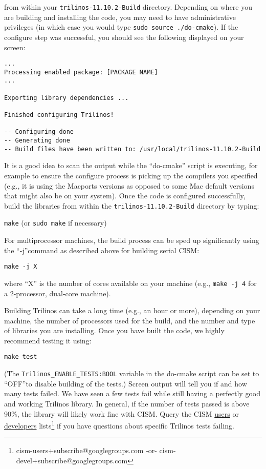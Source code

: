 \noindent
from within your \texttt{trilinos-11.10.2-Build} directory. Depending on where you are building and installing the code, you may need to have administrative privileges (in which case you would type \texttt{sudo source ./do-cmake}). If the configure step was successful, you should see the following displayed on your screen:

\begin{verbatim}
...
Processing enabled package: [PACKAGE NAME]
...

Exporting library dependencies ...

Finished configuring Trilinos!

-- Configuring done
-- Generating done
-- Build files have been written to: /usr/local/trilinos-11.10.2-Build
\end{verbatim}

It is a good idea to scan the output while the ``do-cmake'' script is executing, 
for example to ensure the configure process is picking up the compilers you specified 
(e.g., it is using the Macports versions as opposed to some Mac default versions that 
might also be on your system). Once the code is configured successfully, build the libraries 
from within the \texttt{trilinos-11.10.2-Build} directory by typing:

\texttt{make} (or \texttt{sudo make} if necessary) 

\noindent
For multiprocessor machines, the build process can be sped up significantly using 
the ``-j''command as described above for building serial CISM:

\texttt{make -j X}

\noindent
where ``X'' is the number of cores available on your machine (e.g., \texttt{make -j 4} 
for a 2-processor, dual-core machine).

Building Trilinos can take a long time (e.g., an hour or more), depending on your machine, 
the number of processors used for the build, and the number and type of libraries 
you are installing. Once you have built the code, we highly recommend testing it 
using:

 \texttt{make test} 

\noindent
(The \texttt{Trilinos\_ENABLE\_TESTS:BOOL}
variable in the do-cmake script can be set to ``OFF''to disable building of the tests.)
Screen output will tell you if and how many tests failed. We have seen 
a few tests fail while still having a perfectly good and working Trilinos library. 
In general, if the number of tests passed is above 90\%, the library will likely work fine with CISM.
Query the CISM \href{mailto:cism-users+subscribe@googlegroups.com}{users} or
\href{mailto:cism-devel+subscribe@googlegroups.com}{developers} lists\footnote{cism-users+subscribe@googlegroups.com -or- cism-devel+subscribe@googlegroups.com} 
if you have questions about specific Trilinos tests failing.

